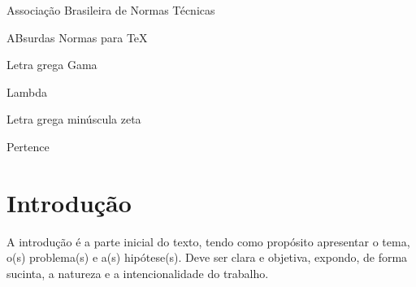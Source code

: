 \documentclass[12pt, oneside, a4paper, chapter=TITLE,section=TITLE]{abntex2}
\begin{document}
\frenchspacing

\pretextual
\imprimircapa %
\imprimirfolhaderosto %


 \listoffigures*
\cleardoublepage

\listoftables*
\cleardoublepage

 \listofquadros*
\cleardoublepage

\begin{siglas}
  \item[ABNT] Associação Brasileira de Normas Técnicas
  \item[abnTeX] ABsurdas Normas para TeX
\end{siglas}


\begin{simbolos}
  \item[$ \Gamma $] Letra grega Gama
  \item[$ \Lambda $] Lambda
  \item[$ \zeta $] Letra grega minúscula zeta
  \item[$ \in $] Pertence
\end{simbolos}



\tableofcontents*


\textual

\chapter[Introdução]{Introdução}
A introdução é a parte inicial do texto, tendo como propósito apresentar o tema, o(s) problema(s) e a(s) hipótese(s). Deve ser clara e objetiva, expondo, de forma sucinta, a natureza e a intencionalidade do trabalho. 
\end{document}
